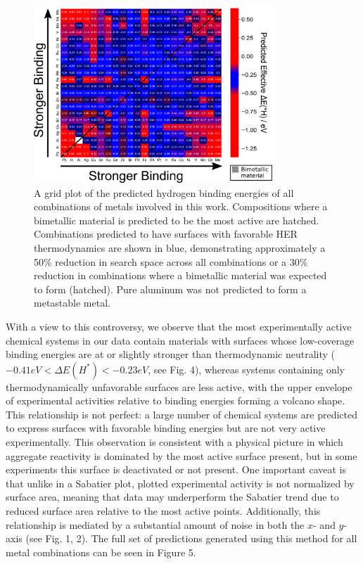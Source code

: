 \documentclass[preprint,12pt]{elsarticle}
\begin{document}
\begin{figure}[h]
\centering
    \includegraphics[width=0.8\textwidth]{figures/fig_5.pdf}
\caption{A grid plot of the predicted hydrogen binding energies of all combinations of metals involved in this work. Compositions where a bimetallic material is predicted to be the most active are hatched. Combinations predicted to have surfaces with favorable HER thermodynamics are shown in blue, demonstrating approximately a 50\% reduction in search space across all combinations or a 30\% reduction in combinations where a bimetallic material was expected to form (hatched). Pure aluminum was not predicted to form a metastable metal.
}
\end{figure}

With a view to this controversy, we observe that the most experimentally active chemical systems in our data contain materials with surfaces whose low-coverage binding energies are at or slightly stronger than thermodynamic neutrality ($-0.41 eV < \Delta E(H^*) < -0.23 eV$, see Fig. 4), whereas systems containing only thermodynamically unfavorable surfaces are less active, with the upper envelope of experimental activities relative to binding energies forming a volcano shape. This relationship is not perfect: a large number of chemical systems are predicted to express surfaces with favorable binding energies but are not very active experimentally. This observation is consistent with a physical picture in which aggregate reactivity is dominated by the most active surface present, but in some experiments this surface is deactivated or not present. One important caveat is that unlike in a Sabatier plot, plotted experimental activity is not normalized by surface area, meaning that data may underperform the Sabatier trend due to reduced surface area relative to the most active points. Additionally, this relationship is mediated by a substantial amount of noise in both the $x$- and $y$-axis (see Fig. 1, 2). The full set of predictions generated using this method for all metal combinations can be seen in Figure 5.
\end{document}
